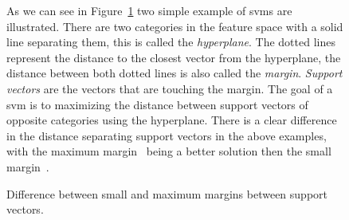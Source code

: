 \begin{figure}[h]
  \centering
  \qquad
  \caption{Difference between small and maximum margins between support vectors.}
  \vspace{1mm}
  \footnotesize{As we can see in Figure~\ref{fig:SVM_margin} two simple example of \gls{svm}s are illustrated. There are two categories in the feature space with a solid line separating them, this is called the \emph{hyperplane}. The dotted lines represent the distance to the closest vector from the hyperplane, the distance between both dotted lines is also called the \emph{margin}. \emph{Support vectors} are the vectors that are touching the margin. The goal of a \gls{svm} is to maximizing the distance between support vectors of opposite categories using the hyperplane. There is a clear difference in the distance separating support vectors in the above examples, with the maximum margin~ being a better solution then the small margin~.}
  \vspace{1mm}
  \label{fig:SVM_margin}
\end{figure}

